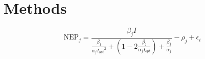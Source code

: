 

\section*{Methods}

%
\begin{equation} 
    \text{NEP}_j = \frac{\beta_j I}
                        {\frac{\beta_j}{\alpha_j {I_{opt}}^2} + 
                          \left(1 - 2 \frac{\beta_j}
                                            {\alpha_j I_{opt}}
                          \right) +
                            \frac{\beta_j}{\alpha_j}
                        } - \rho_j + \epsilon_i
\end{equation}
%
